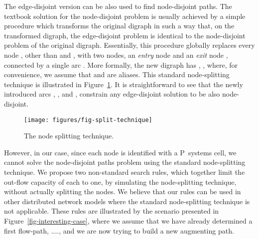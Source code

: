 \documentclass[preliminary,copyright,creativecommons]{eptcs}
\theoremstyle{remark}
\begin{document}
The edge-disjoint version can be also used to find node-disjoint paths.
The textbook solution for the node-disjoint problem is usually 
achieved by a simple procedure which transforms the original digraph
in such a way that, on the transformed digraph,
the edge-disjoint problem is identical to 
the node-disjoint problem of the original digraph. 
Essentially, this procedure globally replaces every node , 
other than  and , with two nodes,
an \emph{entry} node  and an \emph{exit} node ,
connected by a single arc . 
More formally, the new digraph  has
, 
,
where, for convenience, we assume that  and  are aliases.
This standard node-splitting technique is illustrated in Figure~\ref{fig-split-technique}.
It is straightforward to see that the newly introduced arcs
, ,  and ,
constrain any edge-disjoint solution to be also node-disjoint.

\begin{figure}[h]
\centerline{\texttt{[image: figures/fig-split-technique]}}
\caption{The node splitting technique.}
\label{fig-split-technique}
\end{figure}

However, in our case,
since each node is identified with a P~systems cell,
we cannot solve the node-disjoint paths problem
using the standard node-splitting technique.
We propose two non-standard search rules, 
which together limit the out-flow capacity of each  to one,
by simulating the node-splitting technique, without actually splitting the nodes.
We believe that our rules can be used in other distributed network models where 
the standard node-splitting technique is not applicable.
These rules are illustrated by the scenario presented in Figure~\ref{fig-interesting-case},
where we assume that we have already determined a first flow-path, ....,
and we are now trying to build a new augmenting path.
\end{document}
